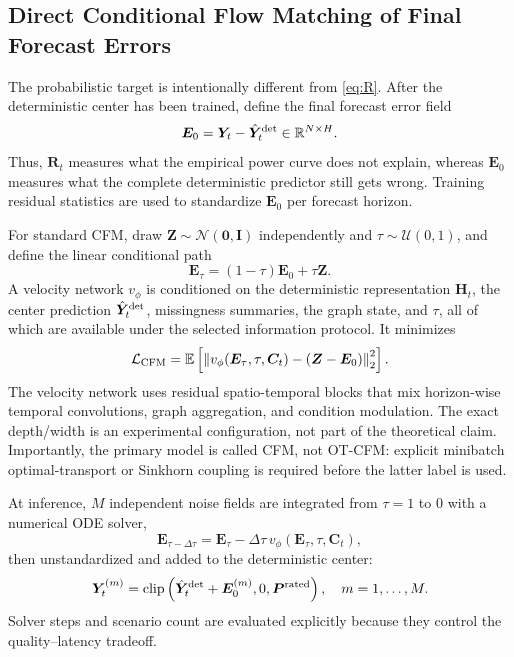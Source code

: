 \documentclass[journal]{IEEEtran}
\newcommand{\R}{\mathbb{R}}
\newcommand{\E}{\mathbb{E}}
\newcommand{\1}{\mathbb{I}}
\begin{document}
\subsection{Direct Conditional Flow Matching of Final Forecast Errors}
The probabilistic target is intentionally different from \eqref{eq:R}. After the deterministic center has been trained, define the final forecast error field
\begin{equation}
\bm E_0=\bm Y_t-\hat{\bm Y}^{\rm det}_t\in\R^{N\times H}.
\label{eq:E}
\end{equation}
Thus, $\bm R_t$ measures what the empirical power curve does not explain, whereas $\bm E_0$ measures what the complete deterministic predictor still gets wrong. Training residual statistics are used to standardize $\bm E_0$ per forecast horizon.

For standard CFM, draw $\bm Z\sim\mathcal N(\bm 0,\bm I)$ independently and $\tau\sim\mathcal U(0,1)$, and define the linear conditional path
\begin{equation}
\bm E_\tau=(1-\tau)\bm E_0+\tau\bm Z.
\end{equation}
A velocity network $v_\phi$ is conditioned on the deterministic representation $\bm H_t$, the center prediction $\hat{\bm Y}^{\rm det}_t$, missingness summaries, the graph state, and $\tau$, all of which are available under the selected information protocol. It minimizes
\begin{equation}
\mathcal L_{\rm CFM}=\E\left[\left\|v_\phi(\bm E_\tau,\tau,\bm C_t)-(\bm Z-\bm E_0)\right\|_2^2\right].
\label{eq:cfm}
\end{equation}
The velocity network uses residual spatio-temporal blocks that mix horizon-wise temporal convolutions, graph aggregation, and condition modulation. The exact depth/width is an experimental configuration, not part of the theoretical claim. Importantly, the primary model is called CFM, not OT-CFM: explicit minibatch optimal-transport or Sinkhorn coupling is required before the latter label is used.

At inference, $M$ independent noise fields are integrated from $\tau=1$ to $0$ with a numerical ODE solver,
\begin{equation}
\bm E_{\tau-\Delta\tau}=\bm E_\tau-\Delta\tau\,v_\phi(\bm E_\tau,\tau,\bm C_t),
\end{equation}
then unstandardized and added to the deterministic center:
\begin{equation}
\bm Y_t^{(m)}=\operatorname{clip}\left(\hat{\bm Y}^{\rm det}_t+\bm E_0^{(m)},0,\bm P^{\rm rated}\right),\quad m=1,\ldots,M.
\label{eq:scenarios}
\end{equation}
Solver steps and scenario count are evaluated explicitly because they control the quality--latency tradeoff.
\end{document}
